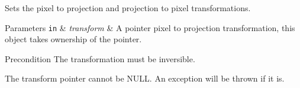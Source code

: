 Sets the pixel to projection and projection to pixel transformations. 


\begin{DoxyParams}[1]{Parameters}
\mbox{\tt in}  & {\em transform} & A pointer pixel to projection transformation, this object takes ownership of the pointer. \\
\hline
\end{DoxyParams}
\begin{DoxyPrecond}{Precondition}
The transformation must be inversible. 

The {\ttfamily transform} pointer cannot be N\+U\+LL. An exception will be thrown if it is. 
\end{DoxyPrecond}
